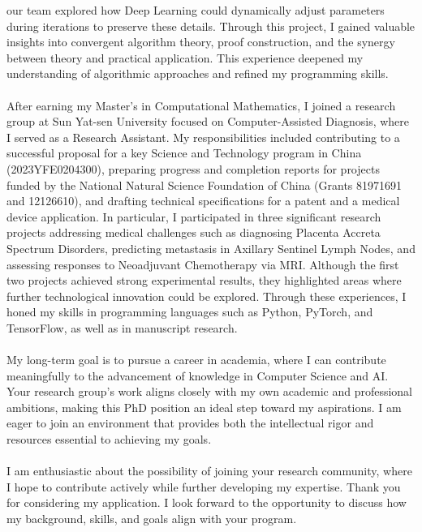 \documentclass[11pt,a4paper, final]{moderncv}
\begin{document}
our team explored how Deep Learning could dynamically adjust parameters during iterations to preserve these details. 
Through this project, I gained valuable insights into convergent algorithm theory, 
proof construction, and the synergy between theory and practical application. 
This experience deepened my understanding of algorithmic approaches and refined my programming skills. 
\ \\
\ \\
After earning my Master's in Computational Mathematics, 
I joined a research group at Sun Yat-sen University focused on Computer-Assisted Diagnosis, 
where I served as a Research Assistant. 
My responsibilities included contributing to a successful proposal for 
a key Science and Technology program in China (2023YFE0204300), 
preparing progress and completion reports for projects funded by 
the National Natural Science Foundation of China (Grants 81971691 and 12126610), 
and drafting technical specifications for a patent and a medical device application. 
In particular, I participated in three significant research projects addressing medical challenges 
such as diagnosing Placenta Accreta Spectrum Disorders, 
predicting metastasis in Axillary Sentinel Lymph Nodes, and assessing responses to Neoadjuvant Chemotherapy via MRI. 
Although the first two projects achieved strong experimental results, 
they highlighted areas where further technological innovation could be explored. 
Through these experiences, I honed my skills in programming languages 
such as Python, PyTorch, and TensorFlow, as well as in manuscript research.
\ \\
\ \\
My long-term goal is to pursue a career in academia, 
where I can contribute meaningfully to the advancement of knowledge in Computer Science and AI. 
Your research group's work aligns closely with my own academic and professional ambitions, 
making this PhD position an ideal step toward my aspirations. 
I am eager to join an environment that provides both the intellectual rigor and resources essential to achieving my goals.
\ \\
\ \\
I am enthusiastic about the possibility of joining your research community, 
where I hope to contribute actively while further developing my expertise. 
Thank you for considering my application. 
I look forward to the opportunity to discuss how my background, skills, and goals align with your program.
\end{document}
